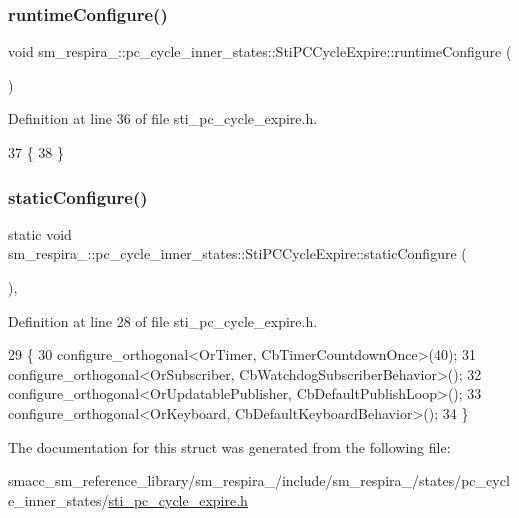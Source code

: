 \subsubsection{\texorpdfstring{runtime\+Configure()}{runtimeConfigure()}}
{\footnotesize\ttfamily void sm\+\_\+respira\+\_\+::pc\+\_\+cycle\+\_\+inner\+\_\+states\+::\+Sti\+P\+C\+Cycle\+Expire\+::runtime\+Configure (\begin{DoxyParamCaption}{ }\end{DoxyParamCaption})\hspace{0.3cm}{\ttfamily [inline]}}



Definition at line 36 of file sti\+\_\+pc\+\_\+cycle\+\_\+expire.\+h.


\begin{DoxyCode}
37   \{
38   \}
\end{DoxyCode}
\mbox{\label{structsm__respira__1_1_1pc__cycle__inner__states_1_1StiPCCycleExpire_a709afc5dd10c05efdd7bfe3f10de1e1d}} 
\subsubsection{\texorpdfstring{static\+Configure()}{staticConfigure()}}
{\footnotesize\ttfamily static void sm\+\_\+respira\+\_\+::pc\+\_\+cycle\+\_\+inner\+\_\+states\+::\+Sti\+P\+C\+Cycle\+Expire\+::static\+Configure (\begin{DoxyParamCaption}{ }\end{DoxyParamCaption})\hspace{0.3cm}{\ttfamily [inline]}, {\ttfamily [static]}}



Definition at line 28 of file sti\+\_\+pc\+\_\+cycle\+\_\+expire.\+h.


\begin{DoxyCode}
29   \{
30     configure\_orthogonal<OrTimer, CbTimerCountdownOnce>(40);
31     configure\_orthogonal<OrSubscriber, CbWatchdogSubscriberBehavior>();
32     configure\_orthogonal<OrUpdatablePublisher, CbDefaultPublishLoop>();
33     configure\_orthogonal<OrKeyboard, CbDefaultKeyboardBehavior>();
34   \}
\end{DoxyCode}


The documentation for this struct was generated from the following file\+:\begin{DoxyCompactItemize}
\item 
smacc\+\_\+sm\+\_\+reference\+\_\+library/sm\+\_\+respira\+\_/include/sm\+\_\+respira\+\_/states/pc\+\_\+cycle\+\_\+inner\+\_\+states/\hyperlink{sti__pc__cycle__expire_8h}{sti\+\_\+pc\+\_\+cycle\+\_\+expire.\+h}\end{DoxyCompactItemize}
